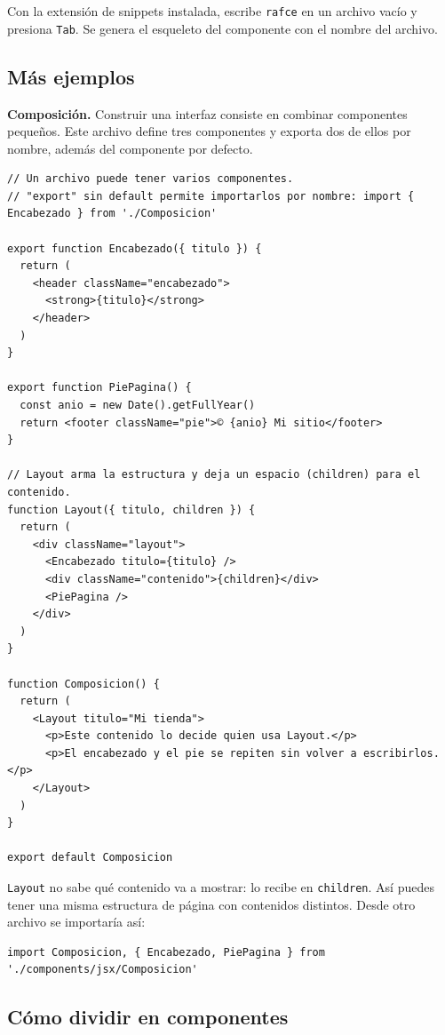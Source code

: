\documentclass[11pt,a4paper]{article}
\newcommand{\cmd}[1]{\texttt{\color{reactdark}#1}}
\begin{document}
\begin{nota}
Con la extensión de snippets instalada, escribe \cmd{rafce} en un archivo vacío y presiona \cmd{Tab}. Se genera el esqueleto del componente con el nombre del archivo.
\end{nota}

\subsection{Más ejemplos}

\textbf{Composición.} Construir una interfaz consiste en combinar componentes pequeños. Este archivo define tres componentes y exporta dos de ellos por nombre, además del componente por defecto.

\begin{lstlisting}[language=JSX,title={\small\ttfamily src/components/jsx/Composicion.jsx}]
// Un archivo puede tener varios componentes.
// "export" sin default permite importarlos por nombre: import { Encabezado } from './Composicion'

export function Encabezado({ titulo }) {
  return (
    <header className="encabezado">
      <strong>{titulo}</strong>
    </header>
  )
}

export function PiePagina() {
  const anio = new Date().getFullYear()
  return <footer className="pie">© {anio} Mi sitio</footer>
}

// Layout arma la estructura y deja un espacio (children) para el contenido.
function Layout({ titulo, children }) {
  return (
    <div className="layout">
      <Encabezado titulo={titulo} />
      <div className="contenido">{children}</div>
      <PiePagina />
    </div>
  )
}

function Composicion() {
  return (
    <Layout titulo="Mi tienda">
      <p>Este contenido lo decide quien usa Layout.</p>
      <p>El encabezado y el pie se repiten sin volver a escribirlos.</p>
    </Layout>
  )
}

export default Composicion
\end{lstlisting}

\cmd{Layout} no sabe qué contenido va a mostrar: lo recibe en \cmd{children}. Así puedes tener una misma estructura de página con contenidos distintos. Desde otro archivo se importaría así:
\begin{lstlisting}[language=JSX]
import Composicion, { Encabezado, PiePagina } from './components/jsx/Composicion'
\end{lstlisting}

\subsection{Cómo dividir en componentes}
\end{document}
